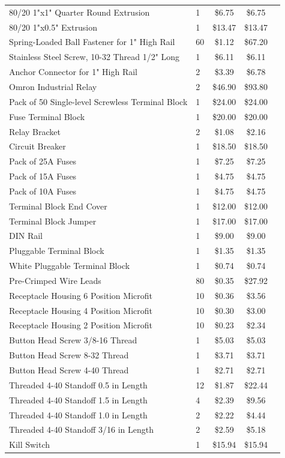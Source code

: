 \documentclass[12pt]{extarticle}
\begin{document}
\begin{appendices}
\begin{table}[H]
\begin{tabular}{ llccl }
80/20 1"x1" Quarter Round Extrusion	&	1	&	\$6.75	&	\$6.75	\\
80/20 1"x0.5" Extrusion	&	1	&	\$13.47	&	\$13.47	\\
Spring-Loaded Ball Fastener for 1" High Rail	&	60	&	\$1.12	&	\$67.20	\\
Stainless Steel Screw, 10-32 Thread 1/2" Long	&	1	&	\$6.11	&	\$6.11	\\
Anchor Connector for 1" High Rail	&	2	&	\$3.39	&	\$6.78	\\
Omron Industrial Relay	&	2	&	\$46.90	&	\$93.80	\\
Pack of 50 Single-level Screwless Terminal Block	&	1	&	\$24.00	&	\$24.00	\\
Fuse Terminal Block	&	1	&	\$20.00	&	\$20.00	\\
Relay Bracket	&	2	&	\$1.08	&	\$2.16	\\
Circuit Breaker	&	1	&	\$18.50	&	\$18.50	\\
Pack of 25A Fuses	&	1	&	\$7.25	&	\$7.25	\\
Pack of 15A Fuses	&	1	&	\$4.75	&	\$4.75	\\
Pack of 10A Fuses	&	1	&	\$4.75	&	\$4.75	\\
Terminal Block End Cover	&	1	&	\$12.00	&	\$12.00	\\
Terminal Block Jumper	&	1	&	\$17.00	&	\$17.00	\\
DIN Rail	&	1	&	\$9.00	&	\$9.00	\\
Pluggable Terminal Block	&	1	&	\$1.35	&	\$1.35	\\
White Pluggable Terminal Block	&	1	&	\$0.74	&	\$0.74	\\
Pre-Crimped Wire Leads	&	80	&	\$0.35	&	\$27.92	\\
Receptacle Housing 6 Position Microfit	&	10	&	\$0.36	&	\$3.56	\\
Receptacle Housing 4 Position Microfit	&	10	&	\$0.30	&	\$3.00	\\
Receptacle Housing 2 Position Microfit	&	10	&	\$0.23	&	\$2.34	\\
Button Head Screw 3/8-16 Thread	&	1	&	\$5.03	&	\$5.03	\\
Button Head Screw 8-32 Thread	&	1	&	\$3.71	&	\$3.71	\\
Button Head Screw 4-40 Thread	&	1	&	\$2.71	&	\$2.71	\\
Threaded 4-40 Standoff 0.5 in Length	&	12	&	\$1.87	&	\$22.44	\\
Threaded 4-40 Standoff 1.5 in Length	&	4	&	\$2.39	&	\$9.56	\\
Threaded 4-40 Standoff 1.0 in Length	&	2	&	\$2.22	&	\$4.44	\\
Threaded 4-40 Standoff 3/16 in Length	&	2	&	\$2.59	&	\$5.18	\\
Kill Switch	&	1	&	\$15.94	&	\$15.94	\\
\end{tabular}
\end{table}


\end{appendices}
\end{document}
